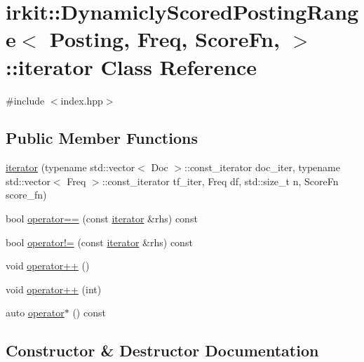 \hypertarget{classirkit_1_1DynamiclyScoredPostingRange_1_1iterator}{}\section{irkit\+:\+:Dynamicly\+Scored\+Posting\+Range$<$ Posting, Freq, Score\+Fn, $>$\+:\+:iterator Class Reference}
\label{classirkit_1_1DynamiclyScoredPostingRange_1_1iterator}


{\ttfamily \#include $<$index.\+hpp$>$}

\subsection*{Public Member Functions}
\begin{DoxyCompactItemize}
\item 
\hyperlink{classirkit_1_1DynamiclyScoredPostingRange_1_1iterator_a38fa17a6184b3a385a26deabfced6e18}{iterator} (typename std\+::vector$<$ Doc $>$\+::const\+\_\+iterator doc\+\_\+iter, typename std\+::vector$<$ Freq $>$\+::const\+\_\+iterator tf\+\_\+iter, Freq df, std\+::size\+\_\+t n, Score\+Fn score\+\_\+fn)
\item 
bool \hyperlink{classirkit_1_1DynamiclyScoredPostingRange_1_1iterator_ac097b4d56a87359fe0f726042d639cc9}{operator==} (const \hyperlink{classirkit_1_1DynamiclyScoredPostingRange_1_1iterator}{iterator} \&rhs) const
\item 
bool \hyperlink{classirkit_1_1DynamiclyScoredPostingRange_1_1iterator_a37c62809d2e9dd22e2be51833bf9de38}{operator!=} (const \hyperlink{classirkit_1_1DynamiclyScoredPostingRange_1_1iterator}{iterator} \&rhs) const
\item 
void \hyperlink{classirkit_1_1DynamiclyScoredPostingRange_1_1iterator_aeb75d55de7b324e3ff31aa7496a0f7c5}{operator++} ()
\item 
void \hyperlink{classirkit_1_1DynamiclyScoredPostingRange_1_1iterator_a0e72e53fba01c4ef07f4ee4495fb786b}{operator++} (int)
\item 
auto \hyperlink{classirkit_1_1DynamiclyScoredPostingRange_1_1iterator_a1608a0963401d8842b1f0e3726e44449}{operator$\ast$} () const
\end{DoxyCompactItemize}


\subsection{Constructor \& Destructor Documentation}
\mbox{\label{classirkit_1_1DynamiclyScoredPostingRange_1_1iterator_a38fa17a6184b3a385a26deabfced6e18}} 
